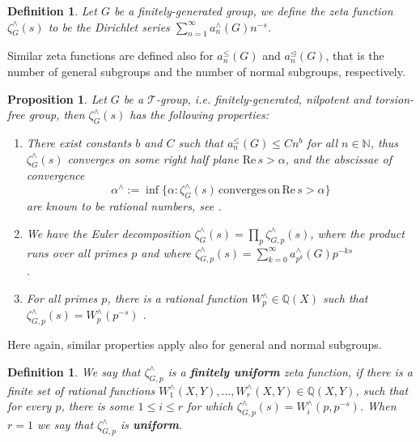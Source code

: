 \documentclass{article}
\newtheorem{proposition}[theorem]{Proposition}
\newtheorem{definition}[theorem]{Definition}
\begin{document}
\begin{definition}
\label{def:zeta-function}
Let $G$ be a finitely-generated group, we define the zeta function $\zeta_{G}^{\wedge}(s)$ to be the Dirichlet series $\sum_{n=1}^{\infty}a_{n}^{\wedge}(G){n}^{-s}$. 
\end{definition}
Similar zeta functions are defined also for $a_{n}^{\leq}(G)$ and $a_{n}^{\trianglelefteq}(G)$, that is the number of general subgroups and the number of normal subgroups, respectively.
\begin{proposition}
\label{prop:t-group-zeta-function}
Let $G$ be a $\mathcal{T}$-group, i.e. finitely-generated, nilpotent and torsion-free group, then $\zeta_{G}^{\wedge}(s)$ has the following properties:\
\begin{enumerate}
    \item There exist constants $b$ and $C$ such that $a_{n}^{\leq}(G)\leq{C}{n}^{b}$ for all $n\in\mathbb{N}$, thus $\zeta_{G}^{\wedge}(s)$ converges on some right half plane $\mathrm{Re}\,s>\alpha$, and the abscissae of convergence \[\alpha^{\wedge}:=\inf\{\alpha : \zeta_{G}^{\wedge}(s)\,\mathrm{converges}\,\mathrm{on}\,\mathrm{Re}\,s>\alpha\}\] are known to be rational numbers, see \cite[Theorem 7.2]{HrushovskiMartinRideau}.

\item We have the Euler decomposition $\zeta_{G}^{\wedge}(s)=\prod_{p}\zeta_{G,p}^{\wedge}(s)$, where the product runs over all primes $p$ and where $\zeta_{G,p}^{\wedge}(s)=\sum_{k=0}^{\infty}a_{p^k}^{\wedge}(G)p^{-ks}$\\ \cite[Proposition 4]{GrunewaldSegalSmith}.

\item For all primes $p$, there is a rational function $W_{p}^{\wedge}\in\mathbb{Q}(X)$ such that $\zeta_{G,p}^{\wedge}(s)=W_{p}^{\wedge}(p^{-s})$ \cite[Theorem 1]{GrunewaldSegalSmith}.
\end{enumerate}
\end{proposition}
Here again, similar properties apply also for general and normal subgroups.
\begin{definition}
We say that $\zeta_{G,p}^{\wedge}$ is a \textbf{finitely uniform} zeta function, if there is a finite set of rational functions $W_{1}^{\wedge}(X,Y),\dots,W_{r}^{\wedge}(X,Y)\in\mathbb{Q}(X,Y)$, such that for every $p$, there is some $1\leq{i}\leq{r}$ for which $\zeta_{G,p}^{\wedge}(s)=W_{i}^{\wedge}(p,p^{-s})$. When $r=1$ we say that $\zeta_{G,p}^{\wedge}$ is \textbf{uniform}.
\end{definition}
\end{document}
